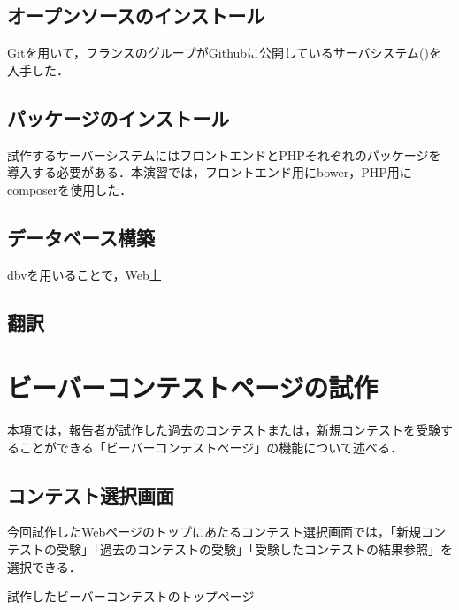 \documentclass[a4paper]{jarticle}
\makeatletter
\newenvironment{figurehere}
  {\def\@captype{figure}}
  {}
\makeatother
\begin{document}
\begin{multicols}{2}
\subsection{オープンソースのインストール}
Gitを用いて，フランスのグループがGithubに公開しているサーバシステム(\cite{bebras-france-platform})を入手した．
\subsection{パッケージのインストール}
試作するサーバーシステムにはフロントエンドとPHPそれぞれのパッケージを導入する必要がある．本演習では，フロントエンド用にbower，PHP用にcomposerを使用した．
\subsection{データベース構築}
dbvを用いることで，Web上

\subsection{翻訳}
\section{ビーバーコンテストページの試作}
本項では，報告者が試作した過去のコンテストまたは，新規コンテストを受験することができる「ビーバーコンテストページ」の機能について述べる．

\subsection{コンテスト選択画面}
今回試作したWebページのトップにあたるコンテスト選択画面では，「新規コンテストの受験」「過去のコンテストの受験」「受験したコンテストの結果参照」を選択できる．

\begin{figurehere}
\begin{center}
\end{center}
\caption{試作したビーバーコンテストのトップページ}\label{fig:1}
\end{figurehere}


\end{multicols}
\end{document}
